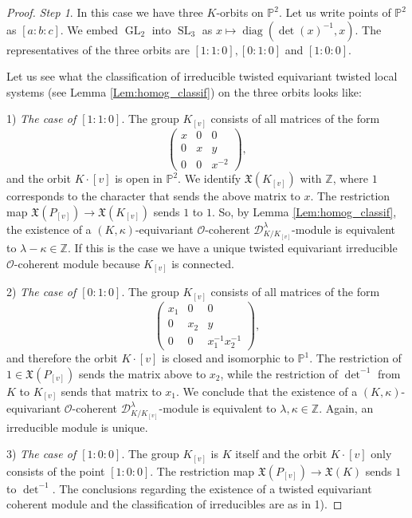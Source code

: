 \documentclass[12pt]{amsart}
\newcommand{\Z}{\mathbb{Z}}
\newcommand{\Pb}{\mathbb{P}}
\theoremstyle{definition}
\numberwithin{equation}{section}
\begin{document}
\begin{proof}
{\it Step 1}.
In this case we have three $K$-orbits on $\mathbb{P}^2$. Let us write points of $\Pb^2$
as $[a:b:c]$. We embed $\operatorname{GL}_2$ into
$\operatorname{SL}_3$ as $x\mapsto \operatorname{diag}(\det(x)^{-1},x)$.
The representatives of the three orbits are $[1:1:0],[0:1:0]$ and
$[1:0:0]$. 

Let us see what the classification of irreducible twisted equivariant twisted local systems (see Lemma
\ref{Lem:homog_classif}) on the three orbits looks like:

1) {\it The case of $[1:1:0]$}. The group $K_{[v]}$ consists of all matrices of the form
$$\begin{pmatrix}x&0&0\\0&x&y\\0&0&x^{-2}\end{pmatrix},$$
and the orbit $K \cdot [v]$ is open in $\Pb^2$. We identify $\mathfrak{X}(K_{[v]})$ with $\Z$, where $1$
corresponds to the character that sends the above matrix to $x$. %
The restriction map $\mathfrak{X}(P_{[v]})\rightarrow \mathfrak{X}(K_{[v]})$ sends
$1$ to $1$.
So, by Lemma \ref{Lem:homog_classif}, the existence of a $(K,\kappa)$-equivariant $\mathcal{O}$-coherent
$\mathscr{D}^\lambda_{K/K_{[v]}}$-module is equivalent to $\lambda-\kappa\in \Z$.
If this is the case we have a unique twisted
equivariant irreducible $\mathcal{O}$-coherent module because $K_{[v]}$ is connected.

2) {\it The case of $[0:1:0]$}. The group $K_{[v]}$ consists of all matrices of the form
$$\begin{pmatrix}x_1&0&0\\0&x_2&y\\0&0&x_1^{-1}x_2^{-1}\end{pmatrix},$$
and therefore the orbit $K \cdot [v]$ is closed and isomorphic to $\Pb^1$. The restriction of $1\in \mathfrak{X}(P_{[v]})$ sends the matrix above to $x_2$,
while the restriction of $\det^{-1}$ from $K$ to $K_{[v]}$ sends that matrix
to $x_1$. We conclude that the existence of a $(K,\kappa)$-equivariant
$\mathcal{O}$-coherent $\mathscr{D}^\lambda_{K/K_{[v]}}$-module is equivalent to
$\lambda,\kappa\in \Z$. Again, an irreducible module is unique.

3) {\it The case of $[1:0:0]$}. The group $K_{[v]}$ is $K$ itself and the orbit $K \cdot [v]$ only consists of the point $[1:0:0]$. The restriction
map $\mathfrak{X}(P_{[v]})\rightarrow \mathfrak{X}(K)$ sends $1$ to $\det^{-1}$.
The conclusions regarding the existence of a twisted equivariant coherent
module and the classification of irreducibles are as in 1).


\end{proof}
\end{document}
